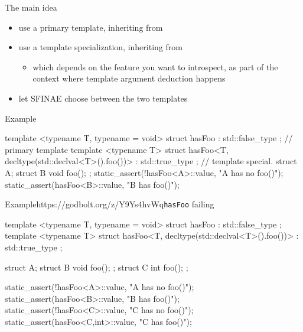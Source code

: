 \begin{frame}[fragile]
  \begin{block}{The main idea}
    \begin{itemize}
    \item use a primary template, inheriting from 
    \item use a template specialization, inheriting from 
    \begin{itemize}
      \item which depends on the feature you want to introspect,
            as part of the context where template argument deduction happens
    \end{itemize}
    \item let SFINAE choose between the two templates
    \end{itemize}
  \end{block}
  \begin{exampleblock}{Example}
    \small
    \begin{cppcode*}{}
      template <typename T, typename = void>
      struct hasFoo : std::false_type {}; // primary template
      template <typename T>
      struct hasFoo<T, decltype(std::declval<T>().foo())>
        : std::true_type {};              // template special.
      struct A{}; struct B{ void foo(); };
      static_assert(!hasFoo<A>::value, "A has no foo()");
      static_assert(hasFoo<B>::value, "B has foo()");
    \end{cppcode*}
  \end{exampleblock}
\end{frame}

\begin{frame}[fragile]
  \begin{exampleblockGB}{Example}{https://godbolt.org/z/Y9Ys4hvWq}{\texttt{hasFoo} failing}
    \small
    \begin{cppcode*}{}
      template <typename T, typename = void>
      struct hasFoo : std::false_type {};
      template <typename T>
      struct hasFoo<T, decltype(std::declval<T>().foo())>
        : std::true_type {};

      struct A{};
      struct B{ void foo(); };
      struct C{ int  foo(); };

      static_assert(!hasFoo<A>::value, "A has no foo()");
      static_assert(hasFoo<B>::value, "B has foo()");
      static_assert(!hasFoo<C>::value, "C has no foo()");
      static_assert(hasFoo<C,int>::value, "C has foo()");
    \end{cppcode*}
  \end{exampleblockGB}
\end{frame}

